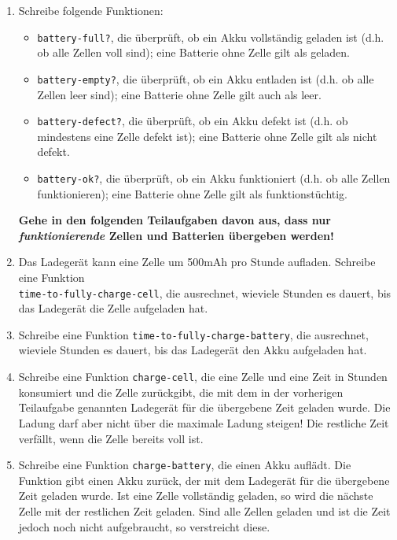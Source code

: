 \begin{aufgabe}
\begin{enumerate}
  \item Schreibe folgende Funktionen:

    \begin{itemize}
    \item \texttt{battery-full?}, die überprüft, ob ein Akku
      vollständig geladen ist (d.h. ob alle Zellen voll sind); eine
      Batterie ohne Zelle gilt als geladen.

    \item \texttt{battery-empty?}, die überprüft, ob ein Akku entladen
      ist (d.h. ob alle Zellen leer sind); eine Batterie ohne Zelle
      gilt auch als leer.

    \item \texttt{battery-defect?}, die überprüft, ob ein Akku defekt
      ist (d.h. ob mindestens eine Zelle defekt ist); eine Batterie
      ohne Zelle gilt als nicht defekt.

    \item \texttt{battery-ok?}, die überprüft, ob ein Akku
      funktioniert (d.h. ob alle Zellen funktionieren); eine Batterie
      ohne Zelle gilt als funktionstüchtig.
      
    \end{itemize}

    \textbf{Gehe in den folgenden Teilaufgaben davon aus, dass
      nur \emph{funktionierende} Zellen und Batterien übergeben
      werden!}

  \item Das Ladegerät kann eine Zelle um 500mAh pro Stunde
    aufladen.  Schreibe eine Funktion \\
    \texttt{time-to-fully-charge-cell}, die ausrechnet, wieviele
    Stunden es dauert, bis das Ladegerät die Zelle aufgeladen hat.

  \item Schreibe eine Funktion
    \texttt{time-to-fully-charge-battery}, die ausrechnet, wieviele
    Stunden es dauert, bis das Ladegerät den Akku aufgeladen hat.

  \item Schreibe eine Funktion \texttt{charge-cell}, die eine
    Zelle und eine Zeit in Stunden konsumiert und die Zelle
    zurückgibt, die mit dem in der vorherigen Teilaufgabe genannten
    Ladegerät für die übergebene Zeit geladen wurde.  Die Ladung darf
    aber nicht über die maximale Ladung steigen!  Die restliche Zeit
    verfällt, wenn die Zelle bereits voll ist.

  \item Schreibe eine Funktion \texttt{charge-battery}, die einen
    Akku auflädt.  Die Funktion gibt einen Akku zurück, der mit dem
    Ladegerät für die übergebene Zeit geladen wurde.  Ist eine Zelle
    vollständig geladen, so wird die nächste Zelle mit der restlichen
    Zeit geladen.  Sind alle Zellen geladen und ist die Zeit jedoch
    noch nicht aufgebraucht, so verstreicht diese.


\end{enumerate}
\end{aufgabe}
